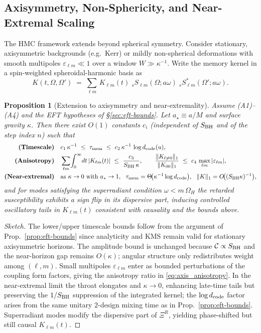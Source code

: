 \documentclass[11pt,a4paper]{article}
\newcommand{\HMC}{\textsc{HMC}\xspace}
\theoremstyle{plain}
\newtheorem{proposition}[theorem]{Proposition}
\theoremstyle{definition}
\theoremstyle{remark}
\begin{document}
\subsection{Axisymmetry, Non-Sphericity, and Near-Extremal Scaling}
\label{sec:axisymmetry}
The \HMC{} framework extends beyond spherical symmetry. Consider stationary, axisymmetric backgrounds (e.g.~Kerr) or mildly
non-spherical deformations with smooth multipoles $\varepsilon_{\ell m}\ll 1$ over a window $W\gg \kappa^{-1}$.
Write the memory kernel in a spin-weighted spheroidal-harmonic basis as
\begin{equation}
K(t,\Omega,\Omega') \;=\; \sum_{\ell m}\,K_{\ell m}(t)\;{}_{s}S_{\ell m}(\Omega;a\omega)\;{}_{s}S^{\ast}_{\ell m}(\Omega';a\omega).\label{eq:kernel_anisotropic}
\end{equation}
\begin{proposition}[Extension to axisymmetry and near-extremality]\label{prop:axisymmetry}
Assume (A1)--(A4) and the EFT hypotheses of \S\ref{sec:eft-bounds}. Let $a_\star\equiv a/M$ and surface gravity $\kappa$.
Then there exist $O(1)$ constants $c_i$ (independent of $S_{\rm BH}$ and of the step index $n$) such that
\begin{align}
\textbf{(Timescale)}\quad& c_1\,\kappa^{-1}\ \le\ \tau_{\rm mem}\ \le\ c_2\,\kappa^{-1}\,\log d_{\rm code}(u),\label{eq:axis_timescale}\\
\textbf{(Anisotropy)}\quad& \sum_{\ell m}\!\int_0^\infty\!dt\,|K_{\ell m}(t)|\ \le\ \frac{c_3}{S_{\rm BH}\,\kappa},
\qquad
\frac{\|K_{\ell\neq 0}\|_1}{\|K_{00}\|_1}\ \le\ c_4\,\max_{\ell m}|\varepsilon_{\ell m}|,\label{eq:axis_anisotropy}\\
\textbf{(Near-extremal)}\quad& \text{as }\kappa\to 0 \text{ with } a_\star\to 1,\ \ 
\tau_{\rm mem} = \Theta\!\big(\kappa^{-1}\log d_{\rm code}\big),
\ \ \|K\|_1 = O\!\big((S_{\rm BH}\kappa)^{-1}\big),\label{eq:axis_extremal}
\end{align}
and for modes satisfying the superradiant condition $\omega<m\,\Omega_H$ the retarded susceptibility exhibits a sign flip in its dispersive part, inducing
controlled oscillatory tails in $K_{\ell m}(t)$ consistent with causality and the bounds above.
\end{proposition}
\begin{proof}[Sketch]
The lower/upper timescale bounds follow from the argument of Prop.~\ref{prop:eft-bounds} since analyticity and KMS remain valid for
stationary axisymmetric horizons. The amplitude bound is unchanged because $\mathcal{C}\propto S_{\rm BH}$ and the near-horizon gap
remains $O(\kappa)$; angular structure only redistributes weight among $(\ell,m)$. Small multipoles $\varepsilon_{\ell m}$ enter as
bounded perturbations of the coupling form factors, giving the anisotropy ratio in \eqref{eq:axis_anisotropy}. In the near-extremal
limit the throat elongates and $\kappa\to 0$, enhancing late-time tails but preserving the $1/S_{\rm BH}$ suppression of the integrated
kernel; the $\log d_{\rm code}$ factor arises from the same unitary $2$-design mixing time as in Prop.~\ref{prop:eft-bounds}. Superradiant
modes modify the dispersive part of $\Xi^R$, yielding phase-shifted but still causal $K_{\ell m}(t)$.\end{proof}
\end{document}
